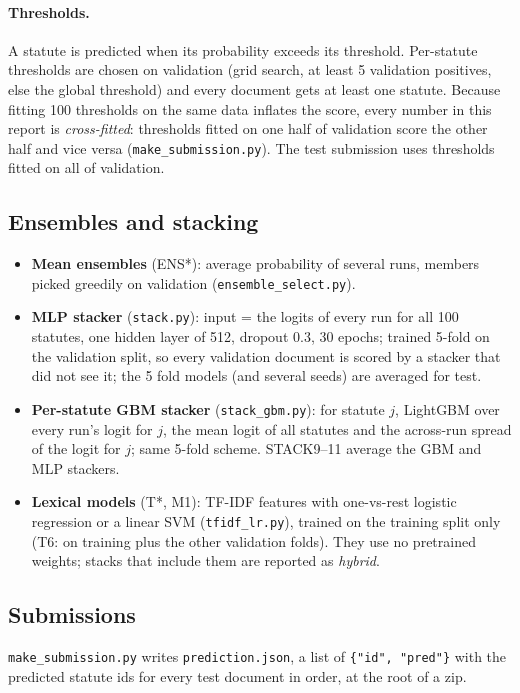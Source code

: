 \documentclass[11pt,a4paper]{article}
\newcommand{\code}[1]{\texttt{\small #1}}
\begin{document}
\paragraph{Thresholds.} A statute is predicted when its probability exceeds its threshold.  Per-statute
thresholds are chosen on validation (grid search, at least 5 validation positives, else the global
threshold) and every document gets at least one statute.  Because fitting 100 thresholds on the same data
inflates the score, every number in this report is \emph{cross-fitted}: thresholds fitted on one half of
validation score the other half and vice versa (\code{make\_submission.py}).  The test submission uses
thresholds fitted on all of validation.

\subsection{Ensembles and stacking}
\begin{itemize}
  \item \textbf{Mean ensembles} (ENS*): average probability of several runs, members picked greedily on
  validation (\code{ensemble\_select.py}).
  \item \textbf{MLP stacker} (\code{stack.py}): input = the logits of every run for all 100 statutes, one hidden
  layer of 512, dropout 0.3, 30 epochs; trained 5-fold on the validation split, so every validation document is
  scored by a stacker that did not see it; the 5 fold models (and several seeds) are averaged for test.
  \item \textbf{Per-statute GBM stacker} (\code{stack\_gbm.py}): for statute $j$, LightGBM over every run's logit
  for $j$, the mean logit of all statutes and the across-run spread of the logit for $j$; same 5-fold scheme.
  STACK9--11 average the GBM and MLP stackers.
  \item \textbf{Lexical models} (T*, M1): TF-IDF features with one-vs-rest logistic regression or a linear SVM
  (\code{tfidf\_lr.py}), trained on the training split only (T6: on training plus the other validation folds).
  They use no pretrained weights; stacks that include them are reported as \emph{hybrid}.
\end{itemize}

\subsection{Submissions}
\code{make\_submission.py} writes \code{prediction.json}, a list of \code{\{"id", "pred"\}} with the predicted
statute ids for every test document in order, at the root of a zip.
\end{document}
